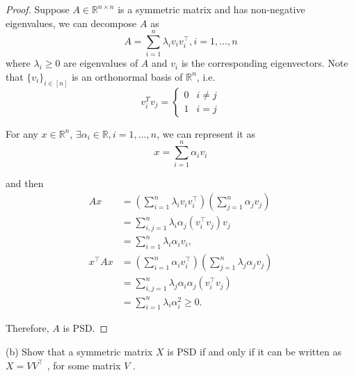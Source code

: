 \documentclass[11pt]{article}
\newcommand{\RR}{\mathbb{R}}
\newcommand{\T}{^\top}
\begin{document}
\begin{proof}
    Suppose $A\in \RR^{n\times n}$ is a symmetric matrix and has non-negative eigenvalues, we can decompose $A$ as
    $$
    A = \sum_{i=1}^{n}\lambda_i v_i v_i\T, i=1, \dots, n
    $$
    where $\lambda_i \geq 0$ are eigenvalues of $A$ and $v_i$ is the corresponding eigenvectors. Note that $\{v_i\}_{i\in[n]}$ is an orthonormal basis of $\RR^n$, i.e.
    $$
    v_i^T v_j= \begin{cases}0 & i \neq j \\ 1 & i=j\end{cases}
    $$
    
    For any $x \in \mathbb{R}^n$, $\exists \alpha_i\in\RR, i=1, \dots, n$, we can represent it as
    $$
    x=\sum_{i=1}^n \alpha_i v_i
    $$
    
    and then    
    $$
    \begin{aligned}
    A x & =\left(\sum_{i=1}^n \lambda_i v_i v_i^{\top}\right)\left(\sum_{j=1}^n \alpha_j v_j\right) \\
    & =\sum_{i, j=1}^n \lambda_i \alpha_j\left(v_i^{\top} v_j\right) v_j \\
    & =\sum_{i=1}^n \lambda_i \alpha_i v_i, \\
    x^{\top} A x & =\left(\sum_{i=1}^n \alpha_i v_i^{\top}\right)\left(\sum_{j=1}^n \lambda_j \alpha_j v_j\right) \\
    & =\sum_{i, j=1}^n \lambda_j \alpha_i \alpha_j\left(v_i^{\top} v_j\right) \\
    & =\sum_{i=1}^n \lambda_i \alpha_i^2 \geqslant 0 .
    \end{aligned}
    $$
    
    
    Therefore, $A$ is PSD.

\end{proof}


(b) Show that a symmetric matrix $X$ is PSD if and only if it can be written as $X = V V\T$ , for
some matrix $V$ .
\end{document}
